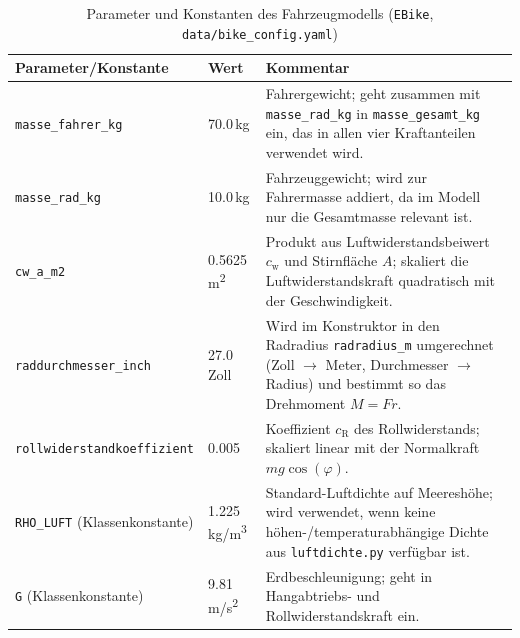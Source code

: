 \begin{table}[htbp]
\centering
\caption{Parameter und Konstanten des Fahrzeugmodells (\texttt{EBike}, \texttt{data/bike\_config.yaml})}
\label{tab:ebike-parameter}
\begin{tabularx}{\textwidth}{@{}llX@{}}
\toprule
Parameter/Konstante & Wert & Kommentar \\
\midrule
\texttt{masse\_fahrer\_kg} & 70.0\,kg & Fahrergewicht; geht zusammen mit \texttt{masse\_rad\_kg} in \texttt{masse\_gesamt\_kg} ein, das in allen vier Kraftanteilen verwendet wird. \\
\texttt{masse\_rad\_kg} & 10.0\,kg & Fahrzeuggewicht; wird zur Fahrermasse addiert, da im Modell nur die Gesamtmasse relevant ist. \\
\texttt{cw\_a\_m2} & 0.5625\,m\textsuperscript{2} & Produkt aus Luftwiderstandsbeiwert $c_{\mathrm{w}}$ und Stirnfläche $A$; skaliert die Luftwiderstandskraft quadratisch mit der Geschwindigkeit. \\
\texttt{raddurchmesser\_inch} & 27.0\,Zoll & Wird im Konstruktor in den Radradius \texttt{radradius\_m} umgerechnet (Zoll $\to$ Meter, Durchmesser $\to$ Radius) und bestimmt so das Drehmoment $M=Fr$. \\
\texttt{rollwiderstandkoeffizient} & 0.005 & Koeffizient $c_{\mathrm{R}}$ des Rollwiderstands; skaliert linear mit der Normalkraft $mg\cos(\varphi)$. \\
\texttt{RHO\_LUFT} (Klassenkonstante) & 1.225\,kg/m\textsuperscript{3} & Standard-Luftdichte auf Meereshöhe; wird verwendet, wenn keine höhen-/temperaturabhängige Dichte aus \texttt{luftdichte.py} verfügbar ist. \\
\texttt{G} (Klassenkonstante) & 9.81\,m/s\textsuperscript{2} & Erdbeschleunigung; geht in Hangabtriebs- und Rollwiderstandskraft ein. \\
\bottomrule
\end{tabularx}
\end{table}
